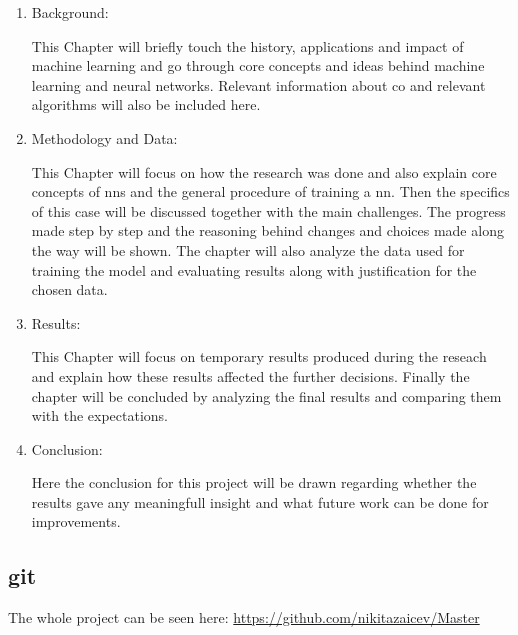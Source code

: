 \begin{enumerate}

\item Background:

This Chapter will briefly touch the history, applications and impact of machine learning and go through core concepts and ideas behind machine learning and neural networks. Relevant information about \gls{co} and relevant algorithms will also be included here.

\item Methodology and Data:

This Chapter will focus on how the research was done and also explain core concepts of \gls{nn}s and the general procedure of training a \gls{nn}. Then the specifics of this case will be discussed together with the main challenges. The progress made step by step and the reasoning behind changes and choices made along the way will be shown. The chapter will also analyze the data used for training the model and evaluating results along with justification for the chosen data.

\item Results:

This Chapter will focus on temporary results produced during the reseach and explain how these results affected the further decisions. Finally the chapter will be concluded by analyzing the final results and comparing them with the expectations.

\item Conclusion:

Here the conclusion for this project will be drawn regarding whether the results gave any meaningfull insight and what future work can be done for improvements.

\end{enumerate}

\subsection{\gls{git}}

The whole project can be seen here: \url{https://github.com/nikitazaicev/Master}